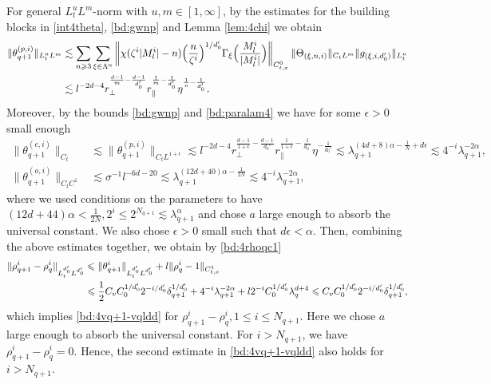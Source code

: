 \documentclass[UTF-8,reqno]{amsart}
\numberwithin{equation}{section}
\theoremstyle{definition}
\def\({{\Big(}}
\def\){{\Big)}}
\newcommand{\norm}[1]{\left\|#1\right\|}
\def\geq{\geqslant}
\def\leq{\leqslant}
\def\({{\Big(}}
\def\){{\Big)}}
\def\geq{\geqslant}
\def\leq{\leqslant}
\begin{document}
For general $L_t^uL^m$-norm with $u,m\in[1,\infty]$, by the estimates for the building blocks in \eqref{int4theta}, \eqref{bd:gwnp} and Lemma \ref{lem:4chi} we obtain
\begin{align}
\|\theta_{q+1}^{(p,i)} \|_{L^u_tL^{m}}&\lesssim\sum_{n\geq3}\sum_{\xi\in\Lambda^{n}}\norm{\chi(\zeta^{i}|M^{i}_l|-n)\(\frac{n}{\zeta^{i}}\)^{1/d_0'}\Gamma_{\xi}\(\frac{M^{i}_l}{|M^{i}_l|}\)}_{C_{t,x}^0}\|\Theta_{(\xi,n,i)} \|_{C_tL^{m}}\|g_{(\xi,i,d_0')}\|_{L_t^{u}}\notag\\ 
&\lesssim l^{-2d-4}r_\perp^{\frac{d-1}{m}-\frac{d-1}{d_0'}} r_\parallel^{\frac{1}{m}-\frac{1}{d_0'}}\eta^{\frac1u-\frac{1}{d_0'}}.\label{bd:4theq+1plp}
\end{align}
Moreover, by the bounds \eqref{bd:gwnp} and \eqref{bd:paralam4} we have for some $\epsilon>0$ small enough
\begin{align}
\|\theta_{q+1}^{(c,i)} \|_{C_t}&\lesssim\|\theta_{q+1}^{(p,i)} \|_{C_tL^{1+\epsilon}}
\lesssim l^{-2d-4}r_\perp^{\frac{d-1}{1+\epsilon}-\frac{d-1}{d_0'}} r_\parallel^{\frac{1}{1+\epsilon}-\frac{1}{d_0'}}\eta^{-\frac{1}{d_0'}}\lesssim  \lambda_{q+1}^{(4d+8)\alpha-\frac1N+d\epsilon}\lesssim4^{-i} \lambda_{q+1}^{-2\alpha},\label{bd:4theq+1clp}\\
\|\theta_{q+1}^{(o,i)}\|_{C_tC^1}%
&\lesssim \sigma^{-1} l^{-6d-20}\lesssim \lambda_{q+1}^{(12d+40)\alpha-\frac1{2N}}\lesssim4^{-i} \lambda_{q+1}^{-2\alpha},\label{bd:4theq+1olp}
\end{align}
where we used  conditions on the parameters to have $(12d+44)\alpha<\frac1{2N},2^i\leq2^{N_{q+1}}\lesssim\lambda_{q+1}^{\alpha}$ and chose $a$ large enough to absorb the universal constant. We also chose $\epsilon>0$ small such that $d\epsilon<\alpha$.
Then, combining the above estimates together, we obtain by   \eqref{bd:4rhoqc1} 
\begin{align}
\|\rho^{i}_{q+1}-\rho^{i}_q\|_{L^{d_0'}_tL^{d_0'}}
&\leq\|\theta^{i}_{q+1}\|_{L^{d_0'}_tL^{d_0'}}+l\|\rho_q^i-1\|_{C_{t,x}^1}\notag\\
&\leq\frac12 C_v C_0^{1/{d_0'}}2^{-i/d_0'}\delta_{q+1}^{1/{d_0'}}+4^{-i} \lambda_{q+1}^{-2\alpha}+l2^{-i}C_0^{1/{d_0'}}  \lambda_q^{d+4}  \leq C_v C_0^{1/{d_0'}}2^{-i/d_0'}\delta_{q+1}^{1/{d_0'}},\notag
\end{align}
which implies \eqref{bd:4vq+1-vqldd} for $\rho^{i}_{q+1}-\rho_q^i,1\leq i\leq N_{q+1}$. Here we chose $a$ large enough to absorb the universal constant. For $i>N_{q+1}$, we have
$
\rho_{q+1}^i-\rho_q^i=0.
$
Hence, the second estimate in \eqref{bd:4vq+1-vqldd} also holds for $i>N_{q+1}$.
\end{document}
